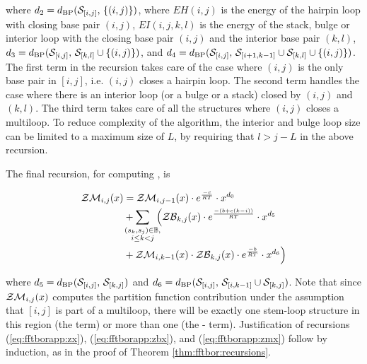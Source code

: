 where $d_2 = d_{\text{BP}}(\mathcal S_{[i,j]},\,\{(i,j)\})$,
where $EH(i,j)$ is the energy of the hairpin loop with closing base
pair $(i,j)$, $EI(i,j,k,l)$ is the energy of the stack, bulge or
interior loop with the closing base pair $(i,j)$ and the interior
base pair $(k,l)$, $d_3 = d_{\text{BP}}(\mathcal S_{[i,j]},\,\mathcal S_{[k,l]} \cup
\{(i,j)\})$, and $d_4 = d_{\text{BP}}(\mathcal S_{[i,j]},\,\mathcal S_{[i+1,k-1]} \cup
\mathcal S_{[k,l]} \cup\{(i,j)\})$.  The first term in the
recursion takes care of the case where $(i,j)$ is the only base pair
in $[i,j]$, i.e. $(i,j)$ closes a hairpin loop. The second term
handles the case where there is an interior loop (or a bulge or a
stack) closed by $(i,j)$ and $(k,l)$. The third term takes care of
all the structures where $(i,j)$ closes a multiloop. To reduce
complexity of the algorithm, the interior and bulge loop size can be
limited to a maximum size of $L$, by requiring that $l>j-L$ in the
above recursion.

The final recursion, for computing \emZM{}, is

\begin{align}
\label{eq:fftborapp:zmx}
\begin{split}
\emZM{i,j} &= \emZM{i,j-1} \cdot \boltzE{c} \cdot x^{d_0} \\
&+ \sum_{\mathclap{\substack{(s_k,s_j) \in \bpSet, \\ i \leq k < j }}}\enspace
\Big( \emZB{k,j} \cdot \boltzE{(b+c(k-i))} \cdot x^{d_5} \\
&+ \emZM{i,k-1} \cdot \emZB{k,j} \cdot \boltzE{b} \cdot x^{d_6} \Big)
\end{split}
\end{align}

where $d_5 = d_{\text{BP}}(\mathcal S_{[i,j]},\,\mathcal S_{[k,j]})$ and $d_6
=d_{\text{BP}}(\mathcal S_{[i,j]},\,\mathcal S_{[i,k-1]} \cup \mathcal S_{[k,j]})$.
Note that since $\mathcal{ZM}_{i,j}(x)$ computes the partition function
contribution under the assumption that $[i,j]$ is part of a
multiloop, there will be exactly one stem-loop structure in this
region (the \emZB{} term) or
more than one (the \emZM{}-\emZB{} term).
Justification of recursions (\ref{eq:fftborapp:zx}),
(\ref{eq:fftborapp:zbx}), and
(\ref{eq:fftborapp:zmx})
follow by induction, as in the proof of Theorem \ref{thm:fftbor:recursions}.
